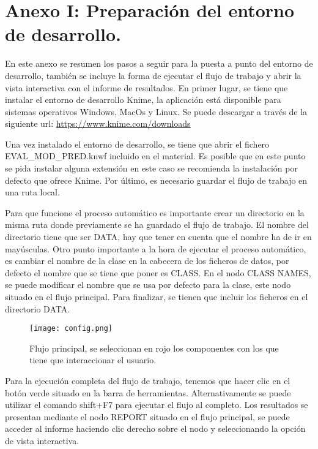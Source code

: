 \section{Anexo I: Preparación del entorno de desarrollo.}

En este anexo se resumen los pasos a seguir para la puesta a punto del entorno de desarrollo, también se incluye la forma de ejecutar el flujo de trabajo y abrir la vista interactiva con el informe de resultados. En primer lugar, se tiene que instalar el entorno de desarrollo Knime, la aplicación está disponible para sistemas operativos Windows, MacOs y Linux. Se puede descargar a través de la siguiente url: \url{https://www.knime.com/downloads}

\bigbreak

Una vez instalado el entorno de desarrollo, se tiene que abrir el fichero EVAL\_MOD\_PRED.knwf incluido en el material. Es posible que en este punto se pida instalar alguna extensión en este caso se recomienda la instalación por defecto que ofrece Knime. Por último, es necesario guardar el flujo de trabajo en una ruta local.

\bigbreak

Para que funcione el proceso automático es importante crear un directorio en la misma ruta donde previamente se ha guardado el flujo de trabajo. El nombre del directorio tiene que ser DATA, hay que tener en cuenta que el nombre ha de ir en mayúsculas. Otro punto importante a la hora de ejecutar el proceso automático, es cambiar el nombre de la clase en la cabecera de los ficheros de datos, por defecto el nombre que se tiene que poner es CLASS. En el nodo CLASS NAMES, se puede modificar el nombre que se usa por defecto para la clase, este nodo situado en el flujo principal. Para finalizar, se tienen que incluir los ficheros en el directorio DATA.

\bigbreak

\begin{figure}[htp]
    \centering
    \texttt{[image: config.png]}
    \caption{Flujo principal, se seleccionan en rojo los componentes con los que tiene que interaccionar el usuario.}
    \label{fig:4}
\end{figure}

\bigbreak

Para la ejecución completa del flujo de trabajo, tenemos que hacer clic en el botón verde situado en la barra de herramientas. Alternativamente se puede utilizar el comando shift+F7 para ejecutar el flujo al completo. Los resultados se presentan mediante el nodo REPORT situado en el flujo principal, se puede acceder al informe haciendo clic derecho sobre el nodo y seleccionando la opción de vista interactiva.

\clearpage